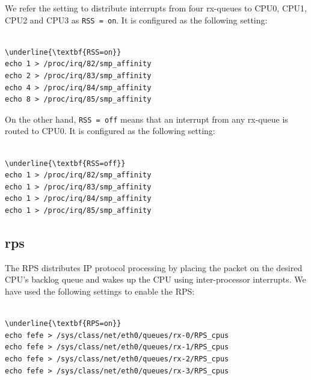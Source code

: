 We refer the setting to distribute interrupts from four rx-queues to CPU0, CPU1, CPU2 and CPU3 as {\tt RSS = on}. 
It is configured as the following setting: 

\begin{center}
\begin{minipage}{0.6\columnwidth}
\begin{Verbatim}[commandchars=\\\{\}]

\underline{\textbf{RSS=on}}
echo 1 > /proc/irq/82/smp_affinity
echo 2 > /proc/irq/83/smp_affinity
echo 4 > /proc/irq/84/smp_affinity
echo 8 > /proc/irq/85/smp_affinity

\end{Verbatim}
\end{minipage}
\end{center}

On the other hand, {\tt RSS = off} means that an interrupt from any rx-queue is routed to CPU0. 
It is configured as the following setting:

\begin{center}
\begin{minipage}{0.6\columnwidth}
\begin{Verbatim}[commandchars=\\\{\}]

\underline{\textbf{RSS=off}}
echo 1 > /proc/irq/82/smp_affinity
echo 1 > /proc/irq/83/smp_affinity
echo 1 > /proc/irq/84/smp_affinity
echo 1 > /proc/irq/85/smp_affinity

\end{Verbatim}
\end{minipage}
\end{center}

\subsection{rps}

The RPS distributes IP protocol processing by placing the packet
on the desired CPU's backlog queue and wakes up the CPU using inter-processor interrupts.
We have used the following settings to enable the RPS:

\begin{center}
\begin{minipage}{0.8\columnwidth}
\begin{Verbatim}[commandchars=\\\{\}]

\underline{\textbf{RPS=on}}
echo fefe > /sys/class/net/eth0/queues/rx-0/RPS_cpus
echo fefe > /sys/class/net/eth0/queues/rx-1/RPS_cpus
echo fefe > /sys/class/net/eth0/queues/rx-2/RPS_cpus
echo fefe > /sys/class/net/eth0/queues/rx-3/RPS_cpus

\end{Verbatim}
\end{minipage}
\end{center}

